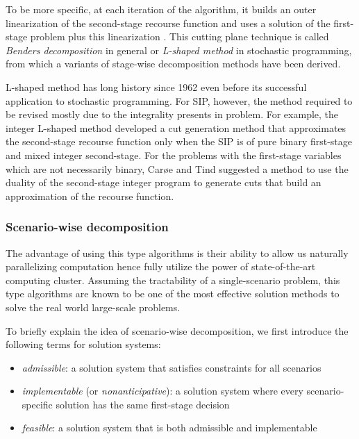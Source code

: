 To be more specific, at each iteration of the algorithm, it builds an outer linearization of the second-stage recourse function and uses a solution of the first-stage problem plus this linearization \cite{book:BL2011}. This cutting plane technique is called \textit{Benders decomposition} \cite{journal:B1962} in general or \textit{L-shaped method} in stochastic programming, from which a variants of stage-wise decomposition methods have been derived. 

L-shaped method has long history since 1962 even before its successful application to stochastic programming. For SIP, however, the method required to be revised mostly due to the integrality presents in problem. For example, the integer L-shaped method \cite{journal:LL1993} developed a cut generation method that approximates the second-stage recourse function only when the SIP is of pure binary first-stage and mixed integer second-stage. For the problems with the first-stage variables which are not necessarily binary, Car{\o}e and Tind \cite{journal:CT1998} suggested a method to use the duality of the second-stage integer program to generate cuts that build an approximation of the recourse function.

\subsubsection{Scenario-wise decomposition}
The advantage of using this type algorithms is their ability to allow us naturally parallelizing computation hence fully utilize the power of state-of-the-art computing cluster. Assuming the tractability of a single-scenario problem, this type algorithms are known to be one of the most effective solution methods to solve the real world large-scale problems.

To briefly explain the idea of scenario-wise decomposition, we first introduce the following terms for solution systems:
\begin{itemize}
	\item \textit{admissible}: a solution system that satisfies constraints for all scenarios
	\item \textit{implementable} (or \textit{nonanticipative}): a solution system where every scenario-specific solution has the same first-stage decision
	\item \textit{feasible}: a solution system that is both admissible and implementable
\end{itemize}

